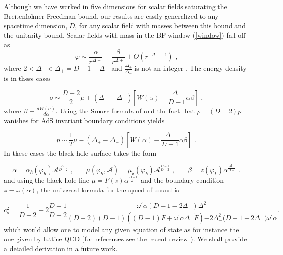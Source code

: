 \documentclass[11pt,epsf,letterpaper]{article}%
\begin{document}
Although we have worked in five dimensions for scalar fields saturating the
Breitenlohner-Freedman bound, our results are easily generalized to any
spacetime dimension, $D$, for any scalar field with masses between this bound
and the unitarity bound. Scalar fields with mass in the BF window
(\ref{window}) fall-off as
\begin{equation}
\varphi\sim\frac{\alpha}{r^{\Delta-}}+\frac{\beta}{r^{\Delta+}}+O(r^{-\Delta
_{-}-1})\text{ ,}%
\end{equation}
where $2<\Delta_{-}<\Delta_{+}=D-1-\Delta_{-}$ and $\frac{\Delta_{+}}%
{\Delta_{-}}$ is not an integer \cite{Henneaux:2006hk}. The energy density is
in these cases \cite{Amsel:2006uf}%

\begin{equation}
\rho\sim\frac{D-2}{2}\mu+\left(  \Delta_{+}-\Delta_{-}\right)  \left[
W(\alpha)-\frac{\Delta_{-}}{D-1}\alpha\beta\right]  \text{ ,}%
\end{equation}
where $\beta=\frac{dW\left(  \alpha\right)  }{d\alpha}$. Using the Smarr
formula of \cite{Liu:2015tqa} and the fact that $\rho-(D-2)p$ vanishes for AdS
invariant boundary conditions yields%

\begin{equation}
p\sim\frac{1}{2}\mu-\left(  \Delta_{+}-\Delta_{-}\right)  \left[
W(\alpha)-\frac{\Delta_{-}}{D-1}\alpha\beta\right]  \text{ .}%
\end{equation}
In these cases the black hole surface takes the form%

\begin{equation}
\alpha=\alpha_{h}\left(  \varphi_{h}\right)  \mathcal{A}^{\frac{\Delta_{-}%
}{D-2}}\text{ ,}\qquad\mu\left(  \varphi_{h},\mathcal{A}\right)  =\mu
_{h}\left(  \varphi_{h}\right)  \mathcal{A}^{\frac{D-1}{D-2}}\text{ ,}%
\qquad\beta=z\left(  \varphi_{h}\right)  \alpha^{\frac{\Delta_{+}}{\Delta-}%
}\text{ .}%
\end{equation}
and using the black hole line $\mu=F(z)\alpha^{\frac{D-1}{\Delta_{-}}}$ and
the boundary condition $z=\omega(\alpha)$, the universal formula for the speed
of sound is%

\begin{equation}
c_{s}^{2}=\frac{1}{D-2}+2\frac{D-1}{D-2}\frac{\omega^{\prime}\alpha
(D-1-2\Delta_{-})\Delta_{-}^{2}}{{(D-2)(D-1)}\left(  {(D-1)F+\omega^{\prime
}\alpha\Delta}_{-}{\dot{F}}\right)  {-2\Delta_{-}^{2}(D-1-2\Delta}_{-}%
{)}\omega^{\prime}{\alpha}}.
\end{equation}
which would allow one to model any given equation of state as for instance the
one given by lattice QCD (for references see the recent review
\cite{Philipsen:2012nu}). We shall provide a detailed derivation in a future work.
\end{document}
